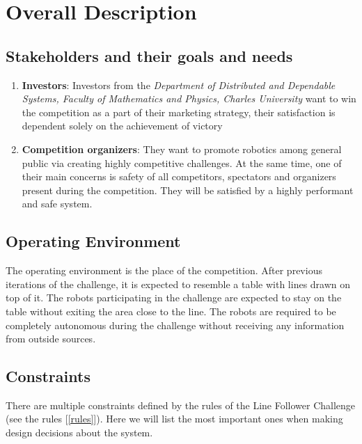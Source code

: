 \chapter{Overall Description}
\label{Overall Description}



\section{Stakeholders and their goals and needs}

\begin{enumerate}
    \item \label{d3s} \textbf{Investors}: Investors from the \textit{Department of Distributed and Dependable Systems, Faculty of Mathematics and Physics, Charles University} want to win the competition as a part of their marketing strategy, their satisfaction is dependent solely on the achievement of victory
    \item \label{organizers} \textbf{Competition organizers}: They want to promote robotics among general public via creating highly competitive challenges. At the same time, one of their main concerns is safety of all competitors, spectators and organizers present during the competition. They will be satisfied by a highly performant and safe system.
\end{enumerate}

\section{Operating Environment}

The operating environment is the place of the competition. After previous iterations of the challenge, it is expected to resemble a table with lines drawn on top of it. The robots participating in the challenge are expected to stay on the table without exiting the area close to the line. The robots are required to be completely autonomous during the challenge without receiving any information from outside sources.

\section{Constraints}

There are multiple constraints defined by the rules of the Line Follower Challenge (see the rules [\ref{rules}]). Here we will list the most important ones when making design decisions about the system.

